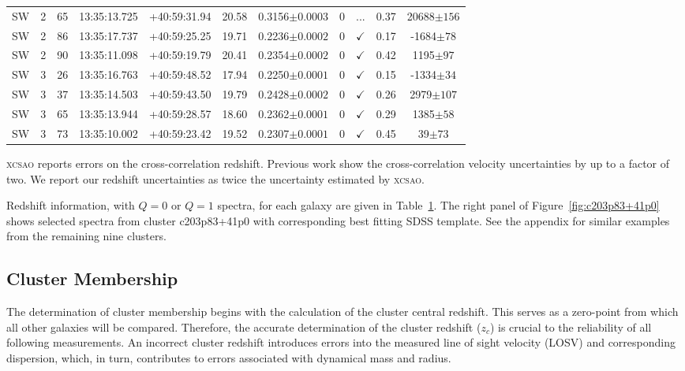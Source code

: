 \begin{table}
\begin{tabular}{ccccccccccc}
		SW & 2 & 65 & 13:35:13.725 & +40:59:31.94 & 20.58 & 0.3156$\pm{0.0003}$ & 0 & ... & 0.37 & 20688$\pm{156}$ \\
		SW & 2 & 86 & 13:35:17.737 & +40:59:25.25 & 19.71 & 0.2236$\pm{0.0002}$ & 0 & $\checkmark$ & 0.17 & -1684$\pm{78}$ \\
		SW & 2 & 90 & 13:35:11.098 & +40:59:19.79 & 20.41 & 0.2354$\pm{0.0002}$ & 0 & $\checkmark$ & 0.42 & 1195$\pm{97}$ \\
		SW & 3 & 26 & 13:35:16.763 & +40:59:48.52 & 17.94 & 0.2250$\pm{0.0001}$ & 0 & $\checkmark$ & 0.15 & -1334$\pm{34}$ \\
		SW & 3 & 37 & 13:35:14.503 & +40:59:43.50 & 19.79 & 0.2428$\pm{0.0002}$ & 0 & $\checkmark$ & 0.26 & 2979$\pm{107}$ \\
		SW & 3 & 65 & 13:35:13.944 & +40:59:28.57 & 18.60 & 0.2362$\pm{0.0001}$ & 0 & $\checkmark$ & 0.29 & 1385$\pm{58}$ \\
		SW & 3 & 73 & 13:35:10.002 & +40:59:23.42 & 19.52 & 0.2307$\pm{0.0001}$ & 0 & $\checkmark$ & 0.45 & 39$\pm{73}$ \\
		\hline 
	\end{tabular}
	\label{tbl:c203p83+41p0} 
\end{table}

\textsc{xcsao} reports errors on the cross-correlation redshift. Previous work  show the cross-correlation velocity uncertainties by up to a factor of two. We report our redshift uncertainties as twice the uncertainty estimated by \textsc{xcsao}.

Redshift information, with $Q=0$ or $Q=1$ spectra, for each galaxy are given in Table~\ref{tbl:c203p83+41p0}. The right panel of Figure~\ref{fig:c203p83+41p0} shows selected spectra from cluster c203p83+41p0 with corresponding best fitting SDSS template. See the appendix for similar examples from the remaining nine clusters.

\subsection{Cluster Membership}\label{sec:cluster membership} 
The determination of cluster membership begins with the calculation of the cluster central redshift. This serves as a zero-point from which all other galaxies will be compared. Therefore, the accurate determination of the cluster redshift ($z_c$) is crucial to the reliability of all following measurements. An incorrect cluster redshift introduces errors into the measured line of sight velocity (LOSV) and corresponding dispersion, which, in turn, contributes to errors associated with dynamical mass and radius. 


